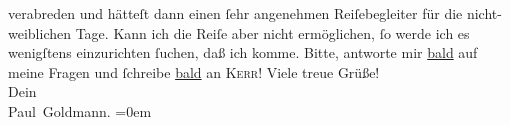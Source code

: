 \begin{ledgroupsized}[t]{13cm}
               verabreden und hätteſt dann einen ſehr angenehmen Reiſebegleiter für die
               nicht-weiblichen Tage.\pend
           \pstart
           Kann ich die Reiſe aber nicht ermöglichen, ſo werde ich es wenigſtens einzurichten
               ſuchen, daß ich \label{K_L02920-4v}\label{K_L02920-4h} komme.\pend
           \pstart
           Bitte, antworte mir \uline{bald} auf meine Fragen und
               ſchreibe \uline{bald} an \textsc{Kerr}!\pend
           \pstart
           Viele treue Grüße! {\\[\baselineskip]}Dein {\\[\baselineskip]}\spacefill\mbox{Paul Goldmann.}\pend
           \leftskip=0em{}
         
         \endnumbering{}\end{ledgroupsized}\begin{anhang}\end{anhang}\newcommand{\dateiname}{L02920}\newcommand{\titel}{Paul Goldmann an Arthur Schnitzler, 16. 6. [1900]}\newcommand{\editorInnen}{Martin Anton Müller und Laura Untner}
      